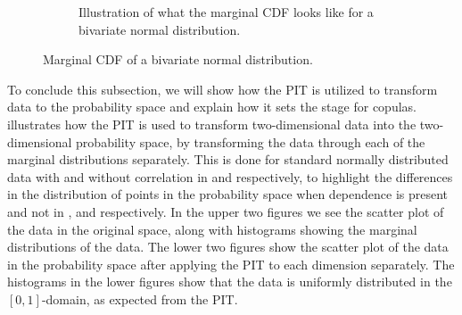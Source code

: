 \begin{figure}
\begin{subfigure}[t]{0.45\linewidth}
        \caption{Illustration of what the marginal \gls{CDF} looks like for a bivariate normal distribution.}
    \end{subfigure}
    \caption{Marginal \gls{CDF} of a bivariate normal distribution.}
    \label{fig:MarginalCDF}
\end{figure}

To conclude this subsection, we will show how the \gls{PIT} is utilized to transform data to the probability space and explain how it sets the stage for copulas.  illustrates how the \gls{PIT} is used to transform two-dimensional data into the two-dimensional probability space, by transforming the data through each of the marginal distributions separately. This is done for standard normally distributed data with and without correlation in  and  respectively, to highlight the differences in the distribution of points in the probability space when dependence is present and not in , and  respectively. In the upper two figures we see the scatter plot of the data in the original space, along with histograms showing the marginal distributions of the data. The lower two figures show the scatter plot of the data in the probability space after applying the \gls{PIT} to each dimension separately. The histograms in the lower figures show that the data is uniformly distributed in the $[0,1]$-domain, as expected from the \gls{PIT}.

